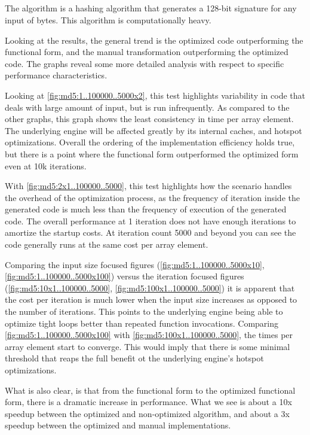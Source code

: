 \subsection{\mdfive}
The \mdfive algorithm \cite{mdfive92} is a hashing algorithm that generates a 128-bit signature for any input of bytes. This algorithm is computationally heavy.

Looking at the results, the general trend is the optimized code outperforming the functional form, and the manual transformation outperforming the optimized code.  The graphs reveal some more detailed analysis with respect to specific performance characteristics.

Looking at \ref{fig:md5:1..100000..5000x2}, this test highlights variability in code that deals with large amount of input, but is run infrequently. As compared to the other graphs, this graph shows the least consistency in time per array element. The underlying engine will be affected greatly by its internal caches, and hotspot optimizations. Overall the ordering of the implementation efficiency holds true, but there is a point where the functional form outperformed the optimized form even at 10k iterations. 

With \ref{fig:md5:2x1..100000..5000}, this test highlights how the scenario handles the overhead of the optimization process, as the frequency of iteration inside the generated code is much less than the frequency of execution of the generated code. The overall performance at 1 iteration does not have enough iterations to amortize the startup costs.  At iteration count 5000 and beyond you can see the code generally runs at the same cost per array element.  

Comparing the input size focused figures (\ref{fig:md5:1..100000..5000x10}, \ref{fig:md5:1..100000..5000x100}) versus the iteration focused figures (\ref{fig:md5:10x1..100000..5000}, \ref{fig:md5:100x1..100000..5000}) it is apparent that the cost per iteration is much lower when the input size increases as opposed to the number of iterations. This points to the underlying engine being able to optimize tight loops better than repeated function invocations.  Comparing \ref{fig:md5:1..100000..5000x100} with \ref{fig:md5:100x1..100000..5000}, the times per array element start to converge.  This would imply that there is some minimal threshold that reaps the full benefit ot the underlying engine's hotspot optimizations. 

What is also clear, is that from the functional form to the optimized functional form, there is a dramatic increase in performance.  What we see is about a 10x speedup between the optimized and non-optimized algorithm, and about a 3x speedup between the optimized and manual implementations. 
